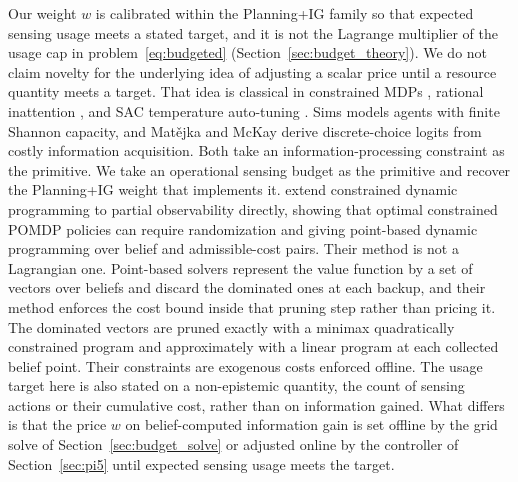 Our weight $w$ is calibrated within the Planning+IG family so that expected sensing usage meets a stated target, and it is not the Lagrange multiplier of the usage cap in problem~\eqref{eq:budgeted} (Section~\ref{sec:budget_theory}). We do not claim novelty for the underlying idea of adjusting a scalar price until a resource quantity meets a target. That idea is classical in constrained MDPs \citep{altman1999}, rational inattention \citep{sims2003,matejka2015}, and SAC temperature auto-tuning \citep{haarnoja2018sac}. Sims \citep{sims2003} models agents with finite Shannon capacity, and Mat\v{e}jka and McKay \citep{matejka2015} derive discrete-choice logits from costly information acquisition. Both take an information-processing constraint as the primitive. We take an operational sensing budget as the primitive and recover the Planning+IG weight that implements it. \citet{kim2011cpomdp} extend constrained dynamic programming to partial observability directly, showing that optimal constrained POMDP policies can require randomization and giving point-based dynamic programming over belief and admissible-cost pairs. Their method is not a Lagrangian one. Point-based solvers represent the value function by a set of vectors over beliefs and discard the dominated ones at each backup, and their method enforces the cost bound inside that pruning step rather than pricing it. The dominated vectors are pruned exactly with a minimax quadratically constrained program and approximately with a linear program at each collected belief point. Their constraints are exogenous costs enforced offline. The usage target here is also stated on a non-epistemic quantity, the count of sensing actions or their cumulative cost, rather than on information gained. What differs is that the price $w$ on belief-computed information gain is set offline by the grid solve of Section~\ref{sec:budget_solve} or adjusted online by the controller of Section~\ref{sec:pi5} until expected sensing usage meets the target.

